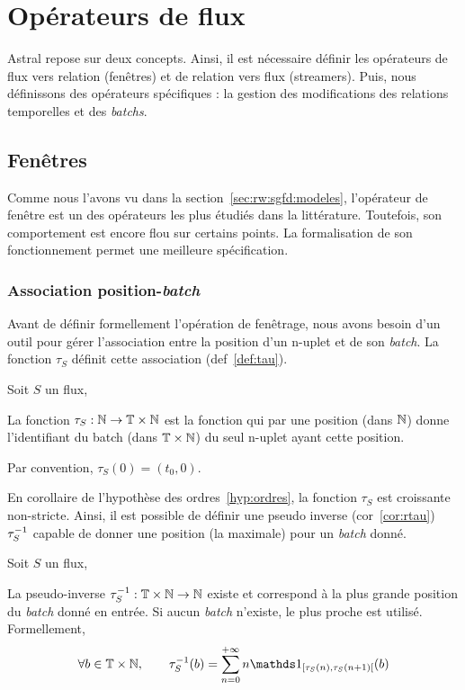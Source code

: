 \section{Opérateurs de flux}\label{sec:contrib:astral:flux}
Astral repose sur deux concepts. Ainsi, il est nécessaire définir les opérateurs de flux vers relation (fenêtres) et de relation vers flux (streamers). Puis, nous définissons des opérateurs spécifiques : la gestion des modifications des relations temporelles et des \textit{batchs}.
\subsection{Fenêtres}
Comme nous l'avons vu dans la section~\ref{sec:rw:sgfd:modeles}, l'opérateur de fenêtre est un des opérateurs les plus étudiés dans la littérature. Toutefois, son comportement est encore flou sur certains points. La formalisation de son fonctionnement permet une meilleure spécification.
\subsubsection{Association position-\textit{batch}}
Avant de définir formellement l'opération de fenêtrage, nous avons besoin d'un outil pour gérer l'association entre la position d'un n-uplet et de son \textit{batch}. La fonction $\tau_S$ définit cette association (def~\ref{def:tau}). 
\begin{defi}\label{def:tau}
    Soit $S$ un flux,

    La fonction $\tau_S : \mathbb{N}\to \mathbb{T}\times\mathbb{N}$ est la fonction qui par une position (dans $\mathbb{N}$) donne l'identifiant du batch (dans $\mathbb{T}\times\mathbb{N}$) du seul n-uplet ayant cette position.

    Par convention, $\tau_S(0)=(t_0,0)$.
\end{defi}

En corollaire de l'hypothèse des ordres~\ref{hyp:ordres}, la fonction $\tau_S$ est croissante non-stricte. Ainsi, il est possible de définir une pseudo inverse (cor~\ref{cor:rtau}) $\tau^{-1}_S$ capable de donner une position (la maximale) pour un \textit{batch} donné.
\begin{coro}\label{cor:rtau}
    Soit $S$ un flux,

    La pseudo-inverse $\tau^{-1}_S:\mathbb{T}\times\mathbb{N}\to \mathbb{N}$ existe et correspond à la plus grande position du \textit{batch} donné en entrée. Si aucun \textit{batch} n'existe, le plus proche est utilisé. Formellement, $$\forall b \in \TN, \qquad \tau_S^{-1}(b) = \sum_{n=0}^{+\infty} n \indic_{[\tau_S(n),\tau_S(n+1)[}(b)$$
\end{coro}


